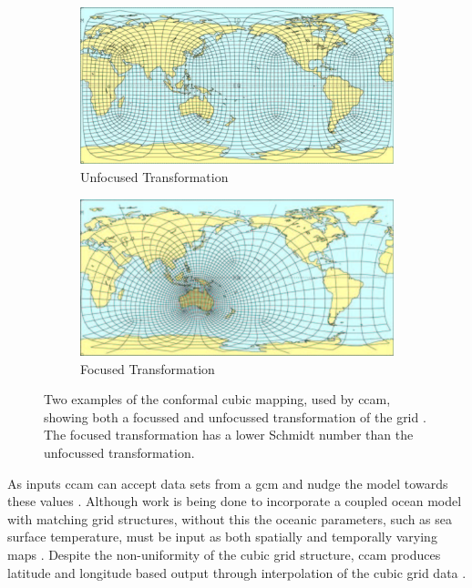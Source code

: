 	\begin{figure}[!htb]
    	\centering	    
		\begin{subfigure}[b]{0.8\textwidth}
			\centering
    		\includegraphics[width=\textwidth,natwidth=1752,natheight=878]{Fig/Research/ccamnormal.png}
			\caption{Unfocused Transformation}
			\label{fig:ccammapnorm} 
		\end{subfigure}

		\begin{subfigure}[b]{0.8\textwidth}
		\centering
    		\includegraphics[width=\textwidth,natwidth=1790,natheight=898]{Fig/Research/ccamfocussed.png}
			\caption{Focused Transformation}
			\label{fig:ccammapfocus}
		\end{subfigure}

		\caption{Two examples of the conformal cubic mapping, used by \gls{ccam}, showing both a focussed and unfocussed transformation of the grid \citep{mcgregor:2005wz}. The focused transformation has a lower Schmidt number than the unfocussed transformation.}
    	\label{fig:ccammap}
	\end{figure}

	As inputs \gls{ccam} can accept data sets from a \gls{gcm} and nudge the model towards these values \citep{mcgregor:2005wz}. Although work is being done to incorporate a coupled ocean model with matching grid structures, without this the oceanic parameters, such as sea surface temperature, must be input as both spatially and temporally varying maps \citep{mcgregor2008updated}. Despite the non-uniformity of the cubic grid structure, \gls{ccam} produces latitude and longitude based output through interpolation of the cubic grid data \citep{thatcher:2015wy}.

